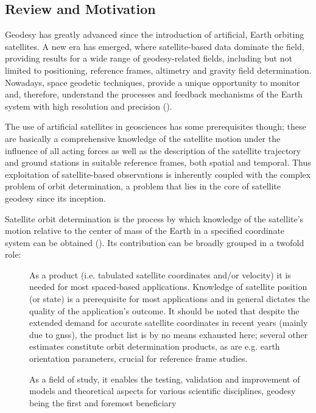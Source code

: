 \subsection{Review and Motivation}\label{ssec:review-and-motvation}

Geodesy has greatly advanced since the introduction of artificial, Earth orbiting 
satellites. A new era has emerged, where satellite-based data dominate the field, 
providing results for a wide range of geodesy-related fields, including but not 
limited to positioning, reference frames, altimetry and gravity field determination. 
Nowadays, space geodetic techniques, provide a unique opportunity to monitor and, 
therefore, understand the processes and feedback mechanisms of the Earth 
system with high resolution and precision (\cite{Jin2013}).

The use of artificial satellites in geosciences has some prerequisites though; 
these are basically a comprehensive knowledge of the satellite motion under 
the influence of all acting forces as well as the description of the satellite
trajectory and ground stations in suitable reference frames, both spatial and 
temporal. Thus exploitation of satellite-based observations is inherently 
coupled with the complex problem of orbit determination, a problem that lies in 
the core of satellite geodesy since its inception.

Satellite orbit determination is the process by which knowledge of the satellite’s
motion relative to the center of mass of the Earth in a specified coordinate 
system can be obtained (\cite{Tapley2004}). Its contribution can be broadly
grouped in a twofold role:
\begin{description}
    \item[] As a product (i.e. tabulated satellite coordinates and/or velocity) 
    it is needed for most spaced-based applications. Knowledge of satellite 
    position (or state) is a prerequisite for most applications and in general 
    dictates the quality of the application's outcome. It should be noted that 
    despite the extended demand for accurate satellite coordinates in recent 
    years (mainly due to \gls{gnss}), the product list is by no means exhausted here; 
    several other estimates constitute orbit determination products, as are e.g. 
    earth orientation parameters, crucial for reference frame studies.
    \item[] As a field of study, it enables the testing, validation and improvement 
    of models and theoretical aspects for various scientific disciplines, 
    geodesy being the first and foremost beneficiary
\end{description}

